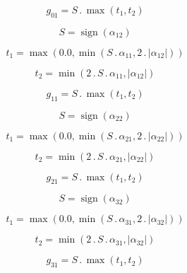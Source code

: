 \documentclass{article}
\begin{document}
\begin{dmath}g_{01} = S \,.\, \max\left(t_{1}, t_{2}\right)\end{dmath}

\begin{dmath}S = \operatorname{sign}{\left (\alpha_{12} \right )}\end{dmath}

\begin{dmath}t_{1} = \max\left(0.0, \min\left(S \,.\, \alpha_{11}, 2 \,.\, \left|{\alpha_{12}}\right|\right)\right)\end{dmath}

\begin{dmath}t_{2} = \min\left(2 \,.\, S \,.\, \alpha_{11}, \left|{\alpha_{12}}\right|\right)\end{dmath}

\begin{dmath}g_{11} = S \,.\, \max\left(t_{1}, t_{2}\right)\end{dmath}

\begin{dmath}S = \operatorname{sign}{\left (\alpha_{22} \right )}\end{dmath}

\begin{dmath}t_{1} = \max\left(0.0, \min\left(S \,.\, \alpha_{21}, 2 \,.\, \left|{\alpha_{22}}\right|\right)\right)\end{dmath}

\begin{dmath}t_{2} = \min\left(2 \,.\, S \,.\, \alpha_{21}, \left|{\alpha_{22}}\right|\right)\end{dmath}

\begin{dmath}g_{21} = S \,.\, \max\left(t_{1}, t_{2}\right)\end{dmath}

\begin{dmath}S = \operatorname{sign}{\left (\alpha_{32} \right )}\end{dmath}

\begin{dmath}t_{1} = \max\left(0.0, \min\left(S \,.\, \alpha_{31}, 2 \,.\, \left|{\alpha_{32}}\right|\right)\right)\end{dmath}

\begin{dmath}t_{2} = \min\left(2 \,.\, S \,.\, \alpha_{31}, \left|{\alpha_{32}}\right|\right)\end{dmath}

\begin{dmath}g_{31} = S \,.\, \max\left(t_{1}, t_{2}\right)\end{dmath}
\end{document}
